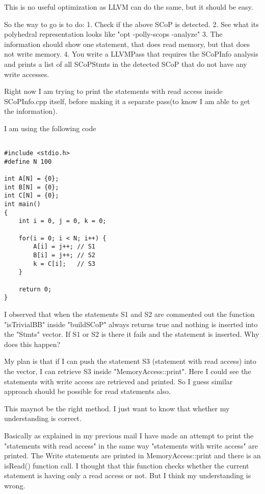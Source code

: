 \documentclass[a4paper,10pt]{article}
\begin{document}
This is no useful optimization as LLVM can do the same, but it should be easy.

So the way to go is to do:
1. Check if the above SCoP is detected.
2. See what its polyhedral representation looks like "opt -polly-scops -analyze"
3. The information should show one statement, that does read memory, but that does not write memory.
4. You write a LLVMPass that requires the SCoPInfo analysis and prints a list of all SCoPStmts in the detected SCoP that do not have any write accesses. 


Right now I am trying to print the statements with read access inside SCoPInfo.cpp itself, before making it a separate pass(to know I am able to get the information).

I am using the following code 


\begin{verbatim}

#include <stdio.h>
#define N 100

int A[N] = {0};
int B[N] = {0};
int C[N] = {0};
int main()
{
    int i = 0, j = 0, k = 0;

    for(i = 0; i < N; i++) {
        A[i] = j++; // S1
        B[i] = j++; // S2
        k = C[i];   // S3
    }   

    return 0;
}

\end{verbatim}

I observed that when the statements S1 and S2 are commented out the function "isTrivialBB" inside "buildSCoP" always returns true and nothing is inserted into the "Stmts" vector. If S1 or S2 is there it fails and the statement is inserted. Why does this happen?

My plan is that if I can push the statement S3 (statement with read access) into the vector, I can retrieve S3 inside "MemoryAccess::print". Here I could see the statements with write access are retrieved and printed. So I guess similar approach should be possible for read statements also.

This maynot be the right method. I just want to know that whether my understanding is correct.

Basically as explained in my previous mail I have made an attempt to print the "statements with read access" in the same way "statements with write access" are printed. The Write statements are printed in MemoryAccess::print and there is an isRead() function call. I thought that this function checks whether the current statement is having only a read access or not. But I think my understanding is wrong.
\end{document}
